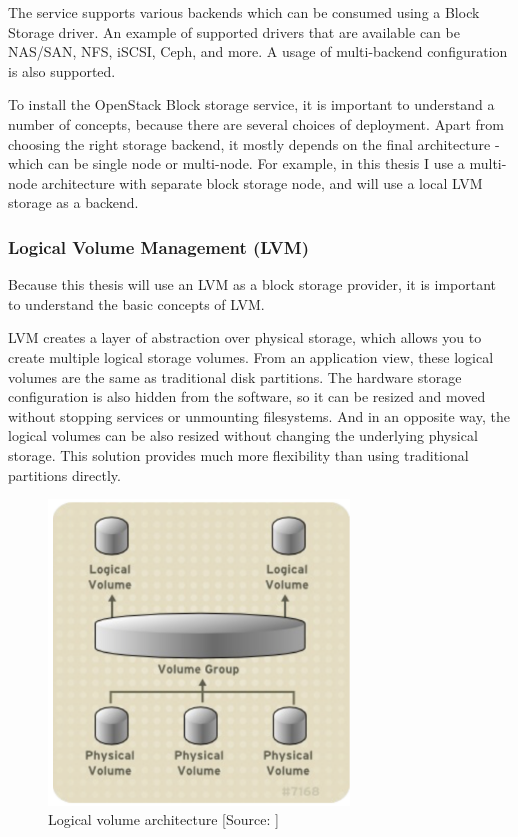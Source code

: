 The service supports various backends which can be consumed using a Block Storage driver. An example of supported drivers that are available can be NAS/SAN, NFS, iSCSI, Ceph, and more. A usage of multi-backend configuration is also supported. \cite{InstallGuide}

To install the OpenStack Block storage service, it is important to understand a number of concepts, because there are several choices of deployment. \cite{OperationsGuide} Apart from choosing the right storage backend, it mostly depends on the final architecture - which can be single node or multi-node. For example, in this thesis I use a multi-node architecture with separate block storage node, and will use a local LVM storage as a backend.

\subsubsection*{Logical Volume Management (LVM)}
Because this thesis will use an LVM as a block storage provider, it is important to understand the basic concepts of LVM.

LVM creates a layer of abstraction over physical storage, which allows you to create multiple logical storage volumes. From an application view, these logical volumes are the same as traditional disk partitions. The hardware storage configuration is also hidden from the software, so it can be resized and moved without stopping services or unmounting filesystems. And in an opposite way, the logical volumes can be also resized without changing the underlying physical storage. This solution provides much more flexibility than using traditional partitions directly. \cite{LVMPdf}

\begin{figure}[!h]
  \centerline{\includegraphics[width=8cm]{fig/lvm_architecture.png}}
  \caption{Logical volume architecture [Source: \cite{LVMPdf}]}
  \label{fig:lvm_architecture}
\end{figure}

